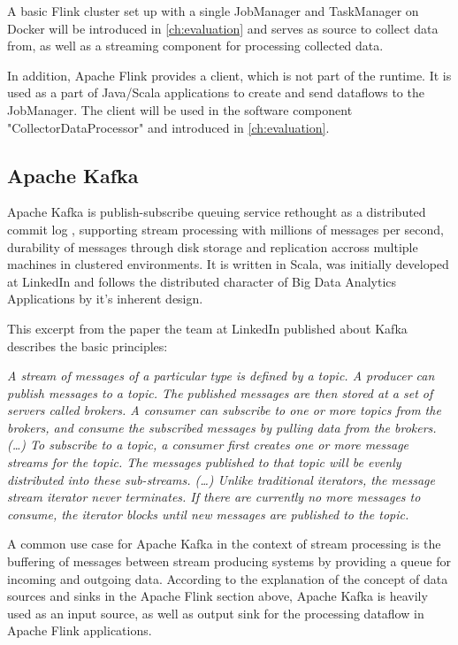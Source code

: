 A basic Flink cluster set up with a single JobManager and TaskManager on Docker will be introduced in
\autoref{ch:evaluation} and serves as source to collect data from, as well as a streaming component for
processing collected data.

In addition, Apache Flink provides a client, which is not part of the runtime. It is used as a part
of Java/Scala applications to create and send dataflows to the JobManager. The client will
be used in the software component "CollectorDataProcessor" and introduced in \autoref{ch:evaluation}.

\subsection{Apache Kafka}

Apache Kafka is publish-subscribe queuing service rethought as a distributed commit log \cite{Kafka16},
supporting stream processing with millions of messages per second, durability of messages through disk
storage and replication accross multiple machines in clustered environments. It is written in Scala, was
initially developed at LinkedIn and follows the distributed character of Big Data Analytics Applications
by it's inherent design.

This excerpt from the paper \cite{Neha11} the team at LinkedIn published about Kafka describes the
basic principles:

\textit{A stream of messages of a particular type is defined by a topic. A producer can publish
messages to a topic. The published messages are then stored at a set of servers called brokers.
A consumer can subscribe to one or more topics from the brokers, and consume the subscribed
messages by pulling data from the brokers. (…) To subscribe to a topic, a consumer first creates
one or more message streams for the topic. The messages published to that topic will be evenly
distributed into these sub-streams. (…)  Unlike traditional iterators, the message stream iterator
never terminates. If there are currently no more messages to consume, the iterator blocks until
new messages are published to the topic.}

A common use case for Apache Kafka in the context of stream processing is the buffering of messages
between stream producing systems by providing a queue for incoming and outgoing data. According
to the explanation of the concept of data sources and sinks in the Apache Flink section above, Apache Kafka
is heavily used as an input source, as well as output sink for the processing dataflow in Apache Flink
applications.

